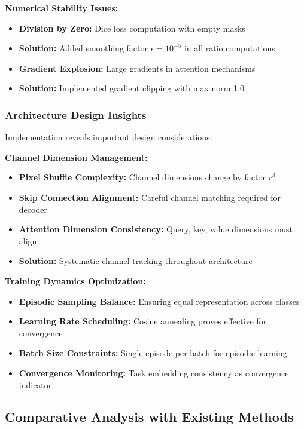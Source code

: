\textbf{Numerical Stability Issues:}
\begin{itemize}
    \item \textbf{Division by Zero:} Dice loss computation with empty masks
    \item \textbf{Solution:} Added smoothing factor $\epsilon = 10^{-5}$ in all ratio computations
    \item \textbf{Gradient Explosion:} Large gradients in attention mechanisms
    \item \textbf{Solution:} Implemented gradient clipping with max norm 1.0
\end{itemize}

\subsubsection*{Architecture Design Insights}
Implementation reveals important design considerations:

\textbf{Channel Dimension Management:}
\begin{itemize}
    \item \textbf{Pixel Shuffle Complexity:} Channel dimensions change by factor $r^3$
    \item \textbf{Skip Connection Alignment:} Careful channel matching required for decoder
    \item \textbf{Attention Dimension Consistency:} Query, key, value dimensions must align
    \item \textbf{Solution:} Systematic channel tracking throughout architecture
\end{itemize}

\textbf{Training Dynamics Optimization:}
\begin{itemize}
    \item \textbf{Episodic Sampling Balance:} Ensuring equal representation across classes
    \item \textbf{Learning Rate Scheduling:} Cosine annealing proves effective for convergence
    \item \textbf{Batch Size Constraints:} Single episode per batch for episodic learning
    \item \textbf{Convergence Monitoring:} Task embedding consistency as convergence indicator
\end{itemize}

\subsection{Comparative Analysis with Existing Methods}

